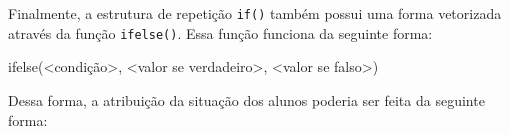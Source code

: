 \documentclass[
  10pt,
  a4paper]{book}
\newenvironment{Shaded}{\begin{snugshade}}{\end{snugshade}}
\newcommand{\FunctionTok}[1]{\textcolor[rgb]{0.00,0.00,0.00}{#1}}
\newcommand{\NormalTok}[1]{#1}
\newcommand{\SpecialCharTok}[1]{\textcolor[rgb]{0.00,0.00,0.00}{#1}}
\begin{document}
Finalmente, a estrutura de repetição \texttt{if()} também possui uma forma
vetorizada através da função \texttt{ifelse()}. Essa função funciona da
seguinte forma:

\begin{Shaded}
\begin{Highlighting}[]
\FunctionTok{ifelse}\NormalTok{(}\SpecialCharTok{\textless{}}\NormalTok{condição}\SpecialCharTok{\textgreater{}}\NormalTok{, }\SpecialCharTok{\textless{}}\NormalTok{valor se verdadeiro}\SpecialCharTok{\textgreater{}}\NormalTok{, }\SpecialCharTok{\textless{}}\NormalTok{valor se falso}\SpecialCharTok{\textgreater{}}\NormalTok{)}
\end{Highlighting}
\end{Shaded}

Dessa forma, a atribuição da situação dos alunos poderia ser feita da
seguinte forma:
\end{document}
